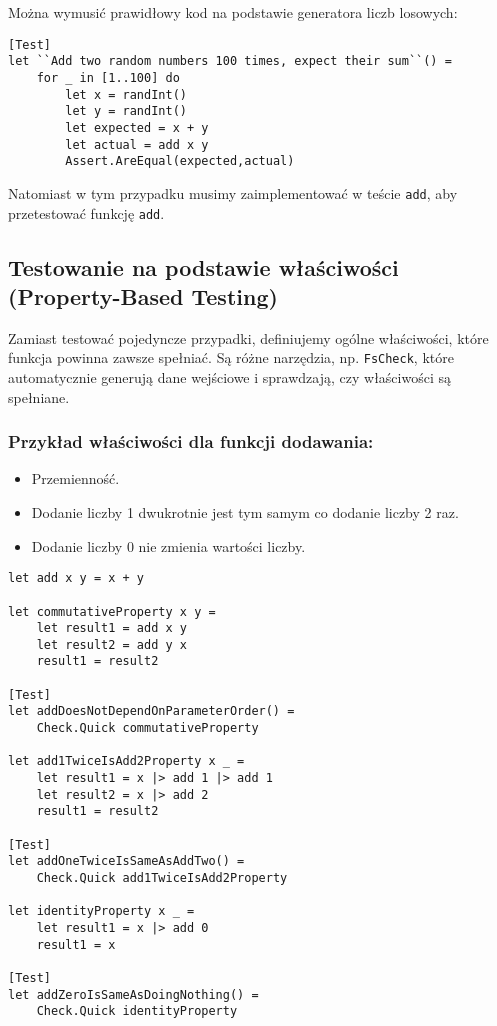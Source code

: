 Można wymusić prawidłowy kod na podstawie generatora liczb losowych:
\lstset{language=FSharp, basicstyle=\scriptsize}
\begin{lstlisting}[frame=single,caption={Przykładowe rozwiązanie},label=kod:listingA]
[Test]
let ``Add two random numbers 100 times, expect their sum``() =
    for _ in [1..100] do
        let x = randInt()
        let y = randInt()
        let expected = x + y
        let actual = add x y
        Assert.AreEqual(expected,actual)
\end{lstlisting}

Natomiast w tym przypadku musimy zaimplementować w teście \texttt{add}, aby przetestować funkcję \texttt{add}.

\subsection{Testowanie na podstawie właściwości (Property-Based Testing)}

Zamiast testować pojedyncze przypadki, definiujemy ogólne właściwości, które funkcja powinna zawsze spełniać. Są różne narzędzia, np. \texttt{FsCheck}, które automatycznie generują dane wejściowe i sprawdzają, czy właściwości są spełniane.

\subsubsection{Przykład właściwości dla funkcji dodawania:}
\begin{itemize}
    \item Przemienność.
    \item Dodanie liczby 1 dwukrotnie jest tym samym co dodanie liczby 2 raz.
    \item Dodanie liczby 0 nie zmienia wartości liczby.
\end{itemize}

\lstset{language=FSharp, basicstyle=\scriptsize}
\begin{lstlisting}[frame=single,caption={Testowanie na właściwościach},label=kod:add_all_properties]
let add x y = x + y

let commutativeProperty x y =
    let result1 = add x y
    let result2 = add y x 
    result1 = result2

[Test]
let addDoesNotDependOnParameterOrder() =
    Check.Quick commutativeProperty

let add1TwiceIsAdd2Property x _ =
    let result1 = x |> add 1 |> add 1
    let result2 = x |> add 2
    result1 = result2

[Test]
let addOneTwiceIsSameAsAddTwo() =
    Check.Quick add1TwiceIsAdd2Property

let identityProperty x _ =
    let result1 = x |> add 0
    result1 = x

[Test]
let addZeroIsSameAsDoingNothing() =
    Check.Quick identityProperty
\end{lstlisting}

